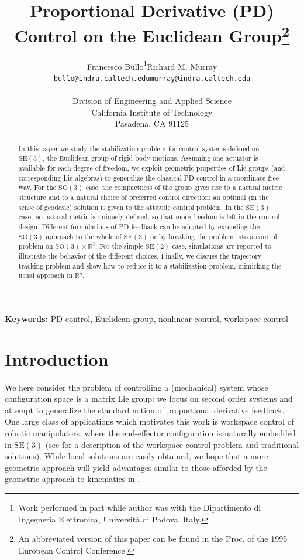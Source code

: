\documentclass[10pt,twocolumn]{article}
\title{Proportional Derivative (PD) Control on the Euclidean Group\thanks{An abbreviated version of this paper can be found in the Proc. of the 1995 European Control Conference.}}
\author{\begin{tabular}{cc}
Francesco Bullo\thanks{Work performed in part while author was with the Dipartimento di Ingegneria Elettronica, Universit\`a di Padova, Italy.} & Richard M. Murray\\
\texttt{bullo@indra.caltech.edu} & \texttt{murray@indra.caltech.edu}
\end{tabular}\\[1em]
Division of Engineering and Applied Science\\
California Institute of Technology\\
Pasadena, CA 91125}
\date{}
\newcommand{\SO}{\mathrm{SO}}
\newcommand{\SE}{\mathrm{SE}}
\newcommand{\R}{\mathbb R}
\begin{document}
\maketitle


\noindent\textbf{Keywords:} PD control, Euclidean group, nonlinear control, workspace control

\begin{abstract}
In this paper we study the stabilization problem for control systems defined on $\SE(3)$, the Euclidean group of rigid-body motions. Assuming one actuator is available for each degree of freedom, we exploit geometric properties of Lie groups (and corresponding Lie algebras) to generalize the classical PD control in a coordinate-free way. For the $\SO(3)$ case, the compactness of the group gives rise to a natural metric structure and to a natural choice of preferred control direction: an optimal (in the sense of geodesic) solution is given to the attitude control problem. In the $\SE(3)$ case, no natural metric is uniquely defined, so that more freedom is left in the control design. Different formulations of PD feedback can be adopted by extending the $\SO(3)$ approach to the whole of $\SE(3)$ or by breaking the problem into a control problem on $\SO(3)\times\R^3$. For the simple $\SE(2)$ case, simulations are reported to illustrate the behavior of the different choices. Finally, we discuss the trajectory tracking problem and show how to reduce it to a stabilization problem, mimicking the usual approach in $\R^n$.
\end{abstract}

\section{Introduction}\label{sec:introduction}
We here consider the problem of controlling a (mechanical) system whose configuration space is a matrix Lie group: we focus on second order systems and attempt to generalize the standard notion of proportional derivative feedback. One large class of applications which motivates this work is workspace control of robotic manipulators, where the end-effector configuration is naturally embedded in $\SE(3)$ (see \cite{1} for a description of the workspace control problem and traditional solutions). While local solutions are easily obtained, we hope that a more geometric approach will yield advantages similar to those afforded by the geometric approach to kinematics in \cite{1}.
\end{document}
